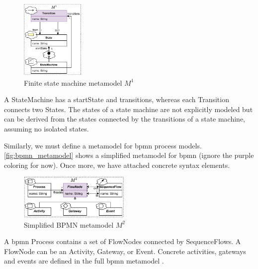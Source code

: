 \documentclass{jot}
\begin{document}
\begin{figure}[h]
    \centering
    \includegraphics[width=0.275\textwidth]{figures/state_machine_metamodel.pdf}
    \caption{Finite state machine metamodel $M^1$}
    \label{fig:fsm_metamodel}
\end{figure}

A \textsf{StateMachine} has a \textsf{startState} and \textsf{transitions}, whereas each \textsf{Transition} connects two \textsf{State}s.
The states of a state machine are not explicitly modeled but can be derived from the states connected by the transitions of a state machine, assuming no isolated states.

Similarly, we must define a metamodel for \gls*{bpmn} process models.
\autoref{fig:bpmn_metamodel} shows a simplified metamodel for \gls*{bpmn} (ignore the purple coloring for now).
Once more, we have attached concrete syntax elements.

\begin{figure}[h]
    \centering
    \includegraphics[width=0.475\textwidth]{figures/bpmn_metamodel.pdf}
    \caption{Simplified BPMN metamodel $M^2$ \cite{objectmanagementgroupBusinessProcessModel2013}}
    \label{fig:bpmn_metamodel}
\end{figure}

A \gls*{bpmn} \textsf{Process} contains a set of \textsf{FlowNode}s connected by \textsf{SequenceFlow}s.
A \textsf{FlowNode} can be an \textsf{Activity}, \textsf{Gateway}, or \textsf{Event}.
Concrete activities, gateways and events are defined in the full \gls*{bpmn} metamodel \cite{objectmanagementgroupBusinessProcessModel2013}. %
\end{document}
